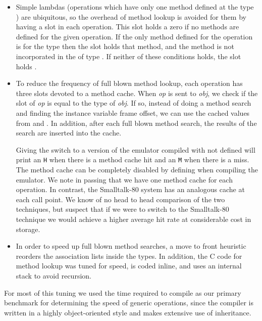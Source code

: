 \begin{itemize}

\item
Simple lambdas (operations which have only one method defined at the
type ) are ubiquitous, so the overhead of method lookup is
avoided for them by having a  slot in each operation.
This slot holds a zero if no methods are defined for the given
operation.  If the only method defined for the operation is for the
type  then the  slot holds that method, and the
method is not incorporated in the  of type
.  If neither of these conditions holds, the
 slot holds .

\item
To reduce the frequency of full blown method lookup, each operation
has three slots devoted to a method cache.  When {\em op} is sent to
{\em obj}, we check if the  slot of {\em op} is equal
to the type of {\em obj}.  If so, instead of doing a method search and
finding the instance variable frame offset, we can use the cached
values from  and .  In addition,
after each full blown method search, the results of the search are
inserted into the cache.

Giving the  switch to a version of the emulator compiled with
 not defined will print an \verb|H| when there is a
method cache hit and an \verb|M| when there is a miss.  The method
cache can be completely disabled by defining
 when compiling the emulator.  We
note in passing that we have one method cache for each operation.  In
contrast, the Smalltalk-80  system has an
analogous cache at each call point.  We know of no head to head
comparison of the two techniques, but suspect that if we were to
switch to the Smalltalk-80 technique we would achieve a higher average
hit rate at considerable cost in storage.

\item
In order to speed up full blown method searches, a move to front
heuristic reorders the association lists inside the types.  In
addition, the C code for method lookup was tuned for speed, is coded
inline, and uses an internal stack to avoid recursion.
\end{itemize}

For most of this tuning we used the time required to compile
 as our primary benchmark for determining the
speed of generic operations, since the compiler is written in a highly
object-oriented style and makes extensive use of inheritance.



